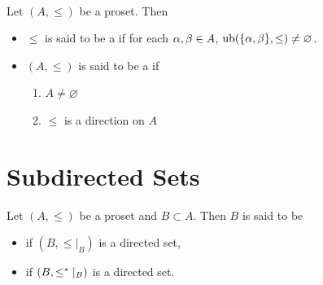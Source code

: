 \documentclass{book}
\begin{document}
	\begin{defn}   \\
		Let $(A, \leq)$ be a proset. Then 
		\begin{itemize}
			\item $\leq$ is said to be a  if for each $\alpha, \beta \in A$, $\operatorname{ub}(\{\alpha, \beta\}, \leq) \neq \varnothing$.
			\item $(A, \leq)$ is said to be a  if
			\begin{enumerate}
				\item $A \neq \varnothing$
				\item $\leq$ is a direction on $A$
			\end{enumerate}
		\end{itemize}
	\end{defn}
	
	
	
	
	
	
	
	
	
	
	
	
	
	
	
	
	
	
	
	
	
	
	
	
	
	
	
	
	
	
	
	
	
	
	
	
	
	
	
	
	
	
	
	
	
	
	
	
	
	
	
	
	\newpage
	\section{Subdirected Sets}
	
	\begin{defn} 
		Let $(A, \leq)$ be a proset and $B \subset A$. Then $B$ is said to be 
		\begin{itemize}
			\item {} if $(B, \leq|_B)$ is a directed set,
			\item {} if $(B, \leq^*|_B)$ is a directed set.
		\end{itemize}
	\end{defn}
	
\end{document}
